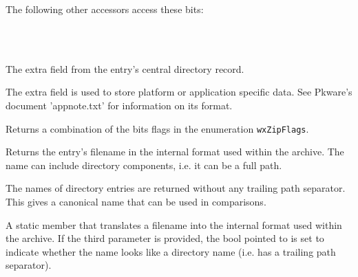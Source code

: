 The following other accessors access these bits:

\\
\\


\label{wxzipentryextra}




The extra field from the entry's central directory record.

The extra field is used to store platform or application specific
data. See Pkware's document 'appnote.txt' for information on its format.


\label{wxzipentrygetflags}


Returns a combination of the bits flags in the enumeration {\tt wxZipFlags}.


\label{wxzipentrygetinternalname}


Returns the entry's filename in the internal format used within the
archive. The name can include directory components, i.e. it can be a
full path.

The names of directory entries are returned without any trailing path
separator. This gives a canonical name that can be used in comparisons.


A static member that translates a filename into the internal format used
within the archive. If the third parameter is provided, the bool pointed
to is set to indicate whether the name looks like a directory name
(i.e. has a trailing path separator).




\label{wxzipentrylocalextra}

